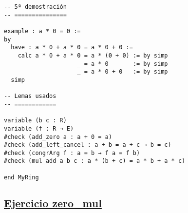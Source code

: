 \begin{verbatim}
-- 5ª demostración
-- ===============

example : a * 0 = 0 :=
by
  have : a * 0 + a * 0 = a * 0 + 0 :=
    calc a * 0 + a * 0 = a * (0 + 0) := by simp
                     _ = a * 0       := by simp
                     _ = a * 0 + 0   := by simp
  simp

-- Lemas usados
-- ============

variable (b c : R)
variable (f : R → E)
#check (add_zero a : a + 0 = a)
#check (add_left_cancel : a + b = a + c → b = c)
#check (congrArg f : a = b → f a = f b)
#check (mul_add a b c : a * (b + c) = a * b + a * c)

end MyRing
\end{verbatim}

\subsection{\href{./src/Basicos/zero\_mul.lean}{Ejercicio zero\_mul}}
\label{sec:org0130605}
